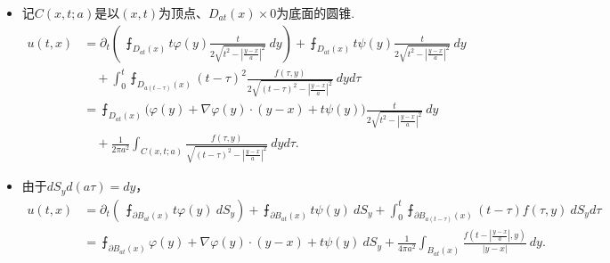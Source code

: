 \begin{itemize}
\begin{remark*}
$n=3$时表达式的第一项
\begin{align*}
    \partial_t\left(\ \intbar_{\!\!\!\partial B_{at}(x)}t\varphi(y)\>dS_y\right)
    &=\partial_t\left(\ \intbar_{\!\!\!\partial B_{a}(0)}t\varphi(x+tz)\>dS_z\right)\\
    &=\intbar_{\!\!\!\partial B_{a}(0)}\varphi(x+tz)+t\nabla\varphi(x+tz)\cdot z\>dS_z\\
    &=\intbar_{\!\!\!\partial B_{at}(x)}\varphi(y)+\nabla\varphi(y)\cdot (y-x)\>dS_y,
\end{align*}
于是$n=3$时的解也写成
\begin{align*}u(t,x)=\intbar_{\!\!\!\partial B_{at}(x)}\varphi(y)
+\nabla\varphi(y)\cdot (y-x)+t\psi(y)\>dS_y.\end{align*}
相应地，$n=2$时的解也写成
\begin{align*}
    u(t,x)=\intbar_{\!\!\!D_{at}(x)}\big(\varphi(y)+\nabla\varphi(y)\cdot (y-x)
    +t\psi(y)\big)\frac{t}{2\sqrt{t^2-|\frac{y-x}{a}|^2}}\>dy.
\end{align*}
\end{remark*}

\item[5.] 记$C(x,t;a)$是以$(x,t)$为顶点、$D_{at}(x)\times0$为底面的圆锥.
\begin{align*}
    u(t,x)&=\partial_t\left(\ \intbar_{\!\!\!D_{at}(x)}t\varphi(y)\frac{t}{2\sqrt{t^2-|\frac{y-x}{a}|^2}}\>dy\right)
    +\intbar_{\!\!\!D_{at}(x)}t\psi(y)\frac{t}{2\sqrt{t^2-|\frac{y-x}{a}|^2}}\>dy\\
    &\quad+\int_0^t\intbar_{\!\!\!D_{a(t-\tau)}(x)}(t-\tau)^2\frac{f(\tau,y)}{2\sqrt{(t-\tau)^2-|\frac{y-x}{a}|^2}}\>dyd\tau\\
    &=\intbar_{\!\!\!D_{at}(x)}\big(\varphi(y)+\nabla\varphi(y)\cdot (y-x)
    +t\psi(y)\big)\frac{t}{2\sqrt{t^2-|\frac{y-x}{a}|^2}}\>dy\\
    &\quad+\frac{1}{2\pi a^2}\int_{C(x,t;a)}\frac{f(\tau,y)}{\sqrt{(t-\tau)^2-|\frac{y-x}{a}|^2}}\>dyd\tau.
\end{align*}

\item[6.] 由于$dS_yd(a\tau)=dy$，
\begin{align*}
    u(t,x)&=\partial_t\left(\ \intbar_{\!\!\!\partial B_{at}(x)}t\varphi(y)\>dS_y\right)
    +\intbar_{\!\!\!\partial B_{at}(x)}t\psi(y)\>dS_y
    +\int_0^t\intbar_{\!\!\!\partial B_{a(t-\tau)}(x)}(t-\tau)f(\tau,y)\>dS_yd\tau\\
    &=\intbar_{\!\!\!\partial B_{at}(x)}\varphi(y)
    +\nabla\varphi(y)\cdot (y-x)+t\psi(y)\>dS_y
    +\frac{1}{4\pi a^2}\int_{B_{at}(x)}\frac{f(t-|\frac{y-x}{a}|,y)}{|y-x|}\>dy.
\end{align*}


\end{itemize}
